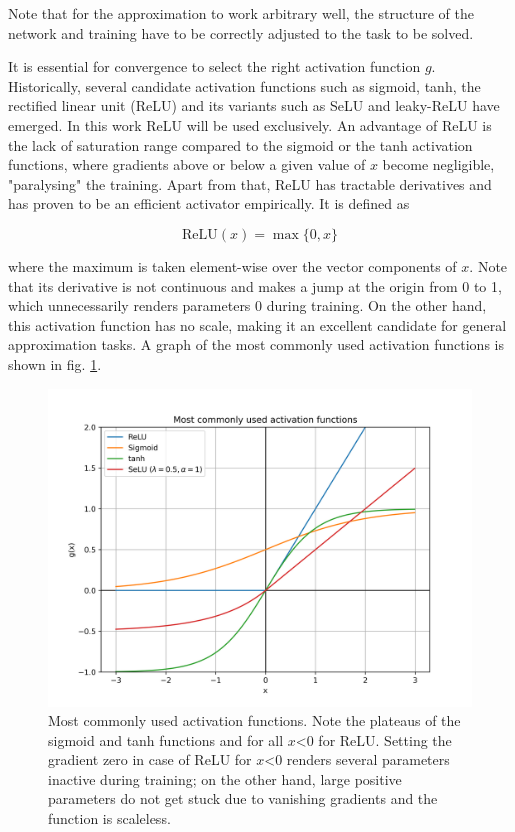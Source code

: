 Note that for the approximation to work arbitrary well, the structure of the network and training have to be correctly adjusted to the task to be solved.

It is essential for convergence to select the right activation function $g$. Historically, several candidate activation functions such as sigmoid, tanh, the rectified linear unit (ReLU) and its variants such as SeLU and leaky-ReLU have emerged. In this work ReLU will be used exclusively. An advantage of ReLU is the lack of saturation range compared to the sigmoid or the tanh activation functions, where gradients above or below a given value of $x$ become negligible, "paralysing" the training. Apart from that, ReLU has tractable derivatives and has proven to be an efficient activator empirically. It is defined as

\begin{equation*}
	\text{ReLU}(x) = \max \{0, x\}
\end{equation*}

where the maximum is taken element-wise over the vector components of $x$. Note that its derivative is not continuous and makes a jump at the origin from 0 to 1, which unnecessarily renders parameters 0 during training. On the other hand, this activation function has no scale, making it an excellent candidate for general approximation tasks. A graph of the most commonly used activation functions is shown in fig. \ref{fig:activations}.

\begin{figure}
	\centering
	\includegraphics[width=0.7\linewidth]{figures/neural_networks/activations}
	\caption{Most commonly used activation functions. Note the plateaus of the sigmoid and tanh functions and for all $x$<0 for ReLU. Setting the gradient zero in case of ReLU for $x$<0 renders several parameters inactive during training; on the other hand, large positive parameters do not get stuck due to vanishing gradients and the function is scaleless.}
	\label{fig:activations}
\end{figure}

